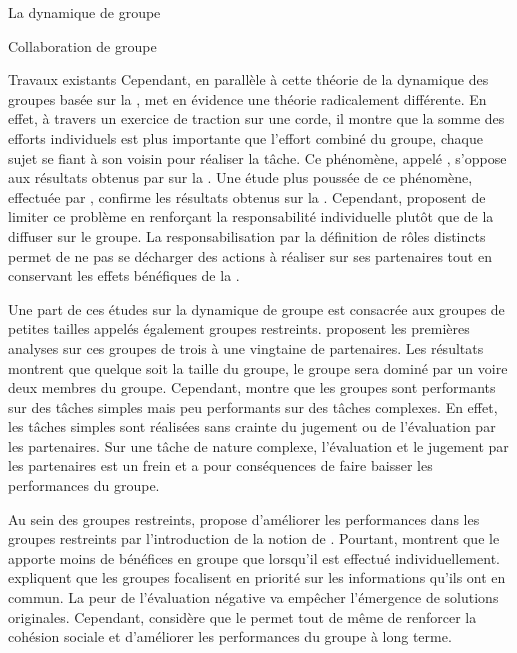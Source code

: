 \documentclass[myfrancais,ngerman,english,frenchb]{mythesis}
\begin{document}
\begin{mychapter}{La dynamique de groupe}
\begin{mysection}{Collaboration de groupe}
\begin{mysubsection}{Travaux existants}
				Cependant, en parallèle à cette théorie de la dynamique des groupes basée sur la ,  met en évidence une théorie radicalement différente.
				En effet, à travers un exercice de traction sur une corde, il montre que la somme des efforts individuels est plus importante que l'effort combiné du groupe, chaque sujet se fiant à son voisin pour réaliser la tâche.
				Ce phénomène, appelé , s'oppose aux résultats obtenus par  sur la .
				Une étude plus poussée de ce phénomène, effectuée par , confirme les résultats obtenus sur la .
				Cependant,  proposent de limiter ce problème en renforçant la responsabilité individuelle plutôt que de la diffuser sur le groupe.
				La responsabilisation par la définition de rôles distincts permet de ne pas se décharger des actions à réaliser sur ses partenaires tout en conservant les effets bénéfiques de la .

				Une part de ces études sur la dynamique de groupe est consacrée aux groupes de petites tailles appelés également groupes restreints.
				 proposent les premières analyses sur ces groupes de trois à une vingtaine de partenaires.
				Les résultats montrent que quelque soit la taille du groupe, le groupe sera dominé par un voire deux membres du groupe.
				Cependant,  montre que les groupes sont performants sur des tâches simples mais peu performants sur des tâches complexes.
				En effet, les tâches simples sont réalisées sans crainte du jugement ou de l'évaluation par les partenaires.
				Sur une tâche de nature complexe, l'évaluation et le jugement par les partenaires est un frein et a pour conséquences de faire baisser les performances du groupe.

				Au sein des groupes restreints,  propose d'améliorer les performances dans les groupes restreints par l'introduction de la notion de \mybrainstorming.
				Pourtant,  montrent que le \mybrainstorming apporte moins de bénéfices en groupe que lorsqu'il est effectué individuellement.
				 expliquent que les groupes focalisent en priorité sur les informations qu'ils ont en commun.
				La peur de l'évaluation négative va empêcher l'émergence de solutions originales.
				Cependant,  considère que le \mybrainstorming permet tout de même de renforcer la cohésion sociale et d'améliorer les performances du groupe à long terme.


\end{mysubsection}
\end{mysection}
\end{mychapter}
\end{document}
